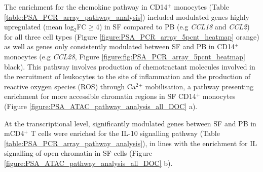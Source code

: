 The enrichment for the chemokine pathway in CD14$^+$ monocytes (Table \ref{table:PSA_PCR_array_pathway_analysis}) included modulated genes highly upregulated (mean log$_2$FC$\geq$4) in SF compared to PB (e.g \textit{CCL18} and \textit{CCL2}) for all three cell types (Figure \ref{figure:PSA_PCR_array_5pcnt_heatmap} orange) as well as genes only consistently modulated between SF and PB in CD14$^+$ monocytes (e.g \textit{CCL28}, Figure \ref{figure:fig:PSA_PCR_array_5pcnt_heatmap} black). This pathway involves production of chemotractant molecules involved in the recruitment of leukocytes to the site of inflammation and the production of reactive oxygen species (ROS) through Ca$^2$$^+$ mobilisation, a pathway presenting enrichment for more accessible chromatin regions in SF CD14$^+$ monocytes (Figure \ref{figure:PSA_ATAC_pathway_analysis_all_DOC} a).

At the transcriptional level, significantly modulated genes between SF and PB in mCD4$^+$ T cells were enriched for the IL-10 signalling pathway (Table \ref{table:PSA_PCR_array_pathway_analysis}), in lines with the enrichment for IL signalling of open chromatin in SF cells (Figure \ref{figure:PSA_ATAC_pathway_analysis_all_DOC} b). 


